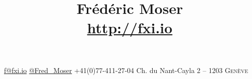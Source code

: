 \documentclass[10pt]{article}
\title{Frédéric Moser \\ {\small \url{http://fxi.io}}}
\makeatletter
\def\maketitle{%
  \begin{center}
    {\Large\sffamily\bfseries \@title}%
  \end{center}%
  \vspace{3ex}
}
\makeatother
\begin{document}
\maketitle


  \faPencil \hspace{1em} \url{f@fxi.io}\hfill
  \faTwitter  \hspace{1em} \url{@Fred_Moser}\hfill
  \faPhone  \hspace{1em} +41(0)77-411-27-04\hfill
  \faHome  \hspace{1em} Ch. du Nant-Cayla 2 --  1203 \textsc{Genève}


%
\end{document}

